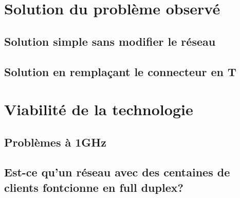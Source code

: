 \documentclass[DIV=15,paper=letter,titlepage=true,fontsize=12pt,headings=normal,captions=nooneline]{scrartcl}
\begin{document}
\section{Solution du problème observé}
\subsection{Solution simple sans modifier le réseau}

\FloatBarrier
\subsection{Solution en remplaçant le connecteur en T}

\FloatBarrier


\section{Viabilité de la technologie}
\subsection{Problèmes à 1GHz}

\FloatBarrier
\subsection{Est-ce qu'un réseau avec des centaines de clients fontcionne en full duplex?}

\FloatBarrier
\end{document}
